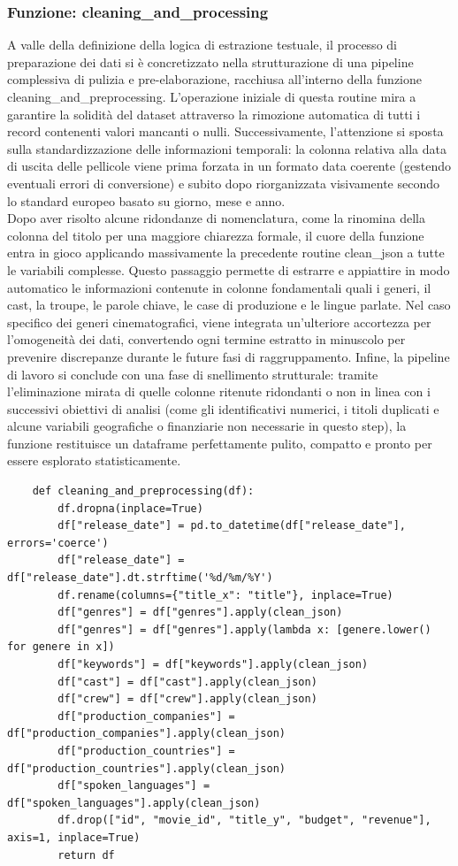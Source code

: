 \documentclass{article}
\begin{document}
\subsubsection{Funzione: cleaning\_and\_processing}
A valle della definizione della logica di estrazione testuale, il processo di preparazione dei dati si \`e concretizzato nella strutturazione di una pipeline complessiva di pulizia e pre-elaborazione, racchiusa all'interno della funzione cleaning\_and\_preprocessing. L'operazione iniziale di questa routine mira a garantire la solidit\`a del dataset attraverso la rimozione automatica di tutti i record contenenti valori mancanti o nulli. Successivamente, l'attenzione si sposta sulla standardizzazione delle informazioni temporali: la colonna relativa alla data di uscita delle pellicole viene prima forzata in un formato data coerente (gestendo eventuali errori di conversione) e subito dopo riorganizzata visivamente secondo lo standard europeo basato su giorno, mese e anno.\\
Dopo aver risolto alcune ridondanze di nomenclatura, come la rinomina della colonna del titolo per una maggiore chiarezza formale, il cuore della funzione entra in gioco applicando massivamente la precedente routine clean\_json a tutte le variabili complesse. Questo passaggio permette di estrarre e appiattire in modo automatico le informazioni contenute in colonne fondamentali quali i generi, il cast, la troupe, le parole chiave, le case di produzione e le lingue parlate. Nel caso specifico dei generi cinematografici, viene integrata un'ulteriore accortezza per l'omogeneità dei dati, convertendo ogni termine estratto in minuscolo per prevenire discrepanze durante le future fasi di raggruppamento. Infine, la pipeline di lavoro si conclude con una fase di snellimento strutturale: tramite l'eliminazione mirata di quelle colonne ritenute ridondanti o non in linea con i successivi obiettivi di analisi (come gli identificativi numerici, i titoli duplicati e alcune variabili geografiche o finanziarie non necessarie in questo step), la funzione restituisce un dataframe perfettamente pulito, compatto e pronto per essere esplorato statisticamente.
\begin{lstlisting}
	def cleaning_and_preprocessing(df):
		df.dropna(inplace=True)
		df["release_date"] = pd.to_datetime(df["release_date"], errors='coerce')
		df["release_date"] = df["release_date"].dt.strftime('%d/%m/%Y')
		df.rename(columns={"title_x": "title"}, inplace=True)
		df["genres"] = df["genres"].apply(clean_json)
		df["genres"] = df["genres"].apply(lambda x: [genere.lower() for genere in x])
		df["keywords"] = df["keywords"].apply(clean_json)
		df["cast"] = df["cast"].apply(clean_json)
		df["crew"] = df["crew"].apply(clean_json)
		df["production_companies"] = df["production_companies"].apply(clean_json)
		df["production_countries"] = df["production_countries"].apply(clean_json)
		df["spoken_languages"] = df["spoken_languages"].apply(clean_json)
		df.drop(["id", "movie_id", "title_y", "budget", "revenue"], axis=1, inplace=True)
		return df
\end{lstlisting}
\end{document}
